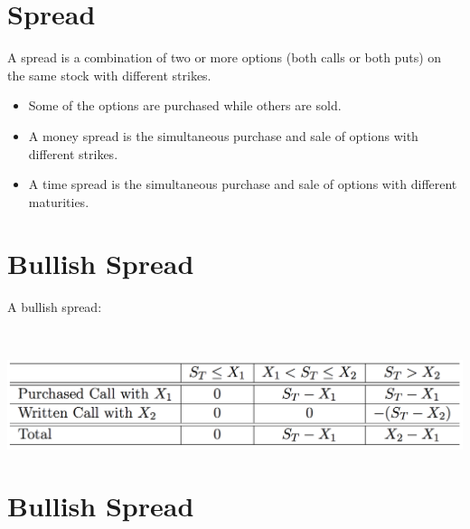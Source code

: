 \documentclass[letterpaper,10pt,english]{sphinxmanual}
\begin{document}
\section{Spread}
\label{options:spread}
A spread is a combination of two or more options (both calls or both
puts) on the same stock with different strikes.
\begin{itemize}
\item {} 
Some of the options are purchased while others are sold.

\end{itemize}
\begin{itemize}
\item {} 
A money spread is the simultaneous purchase and sale of options with
different strikes.

\end{itemize}
\begin{itemize}
\item {} 
A time spread is the simultaneous purchase and sale of options with
different maturities.

\end{itemize}


\section{Bullish Spread}
\label{options:bullish-spread}
A bullish spread:

$\qquad$

{\hfill\includegraphics[width=7in]{table6.png}\hfill}


\section{Bullish Spread}
\label{options:id24}
$\qquad$
\end{document}
